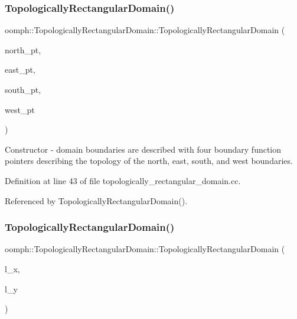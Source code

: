 \subsubsection{\texorpdfstring{Topologically\+Rectangular\+Domain()}{TopologicallyRectangularDomain()}\hspace{0.1cm}{\footnotesize\ttfamily [1/4]}}
{\footnotesize\ttfamily oomph\+::\+Topologically\+Rectangular\+Domain\+::\+Topologically\+Rectangular\+Domain (\begin{DoxyParamCaption}\item[{\hyperlink{classoomph_1_1TopologicallyRectangularDomain_a8b2e24f5500d86c93aef509c5410e7cc}{Boundary\+Fct\+Pt}}]{north\+\_\+pt,  }\item[{\hyperlink{classoomph_1_1TopologicallyRectangularDomain_a8b2e24f5500d86c93aef509c5410e7cc}{Boundary\+Fct\+Pt}}]{east\+\_\+pt,  }\item[{\hyperlink{classoomph_1_1TopologicallyRectangularDomain_a8b2e24f5500d86c93aef509c5410e7cc}{Boundary\+Fct\+Pt}}]{south\+\_\+pt,  }\item[{\hyperlink{classoomph_1_1TopologicallyRectangularDomain_a8b2e24f5500d86c93aef509c5410e7cc}{Boundary\+Fct\+Pt}}]{west\+\_\+pt }\end{DoxyParamCaption})}



Constructor -\/ domain boundaries are described with four boundary function pointers describing the topology of the north, east, south, and west boundaries. 



Definition at line 43 of file topologically\+\_\+rectangular\+\_\+domain.\+cc.



Referenced by Topologically\+Rectangular\+Domain().

\mbox{\label{classoomph_1_1TopologicallyRectangularDomain_a2b21567d1c94ec14df12c9390a9dd195}} 
\subsubsection{\texorpdfstring{Topologically\+Rectangular\+Domain()}{TopologicallyRectangularDomain()}\hspace{0.1cm}{\footnotesize\ttfamily [2/4]}}
{\footnotesize\ttfamily oomph\+::\+Topologically\+Rectangular\+Domain\+::\+Topologically\+Rectangular\+Domain (\begin{DoxyParamCaption}\item[{const double \&}]{l\+\_\+x,  }\item[{const double \&}]{l\+\_\+y }\end{DoxyParamCaption})}



